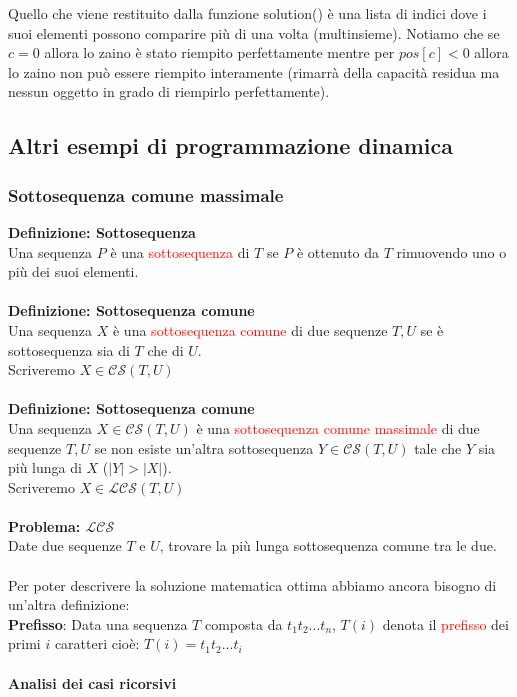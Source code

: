 \documentclass[../cheatSheetAlgoritmi.tex]{subfiles}
\begin{document}
Quello che viene restituito dalla funzione solution() è una lista di indici dove i suoi elementi possono comparire più di una volta (multinsieme). Notiamo che se $c=0$ allora lo zaino è stato riempito perfettamente mentre per $pos[c]<0$ allora lo zaino non può essere riempito interamente (rimarrà della capacità residua ma nessun oggetto in grado di riempirlo perfettamente).
\newpage
\subsection{Altri esempi di programmazione dinamica} 
\subsubsection{Sottosequenza comune massimale}
\textbf{Definizione: Sottosequenza}\\
Una sequenza $P$ è una \textcolor{red}{sottosequenza} di $T$ se $P$ è ottenuto da $T$ rimuovendo uno o più dei suoi elementi.\\\\
\textbf{Definizione: Sottosequenza comune}\\
Una sequenza $X$ è una \textcolor{red}{sottosequenza comune} di due sequenze $T, U$ se è sottosequenza sia di $T$ che di $U$.\\
Scriveremo $X \in \mathcal{CS}(T, U)$\\\\
\textbf{Definizione: Sottosequenza comune}\\
Una sequenza $X \in \mathcal{CS}(T, U)$ è una \textcolor{red}{sottosequenza comune massimale} di due sequenze $T, U$ se non esiste un'altra sottosequenza $Y \in \mathcal{CS}(T, U)$ tale che $Y$ sia più lunga di $X$  ($|Y| > |X|$).\\
Scriveremo $X \in \mathcal{LCS}(T, U)$\\\\
\textbf{Problema: $\mathcal{LCS}$}\\
Date due sequenze $T$ e $U$, trovare la più lunga sottosequenza comune tra le due.\\\\
Per poter descrivere la soluzione matematica ottima abbiamo ancora bisogno di un'altra definizione:\\
\textbf{Prefisso}: Data una sequenza $T$ composta da $t_{1}t_{2}...t_{n}$, $T(i)$ denota il \textcolor{red}{prefisso} dei primi $i$ caratteri cioè: $T(i) = t_{1}t_{2}...t_{i}$\\\\
\textbf{Analisi dei casi ricorsivi}
\end{document}
